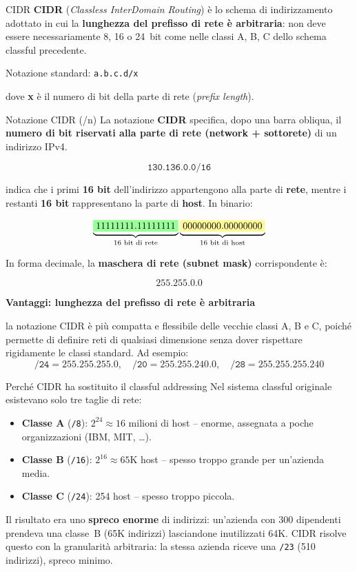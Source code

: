 \documentclass[a4paper,12pt]{report}
\begin{document}
\begin{defbox}{CIDR}
\textbf{CIDR} (\textit{Classless InterDomain Routing}) è lo schema di
indirizzamento adottato in cui la \textbf{lunghezza del prefisso
di rete è arbitraria}: non deve essere necessariamente 8, 16 o 24~bit
come nelle classi A, B, C dello schema classful precedente.

Notazione standard: \quad \texttt{a.b.c.d/x}

dove \textbf{x} è il numero di bit della parte di rete
(\textit{prefix length}).
\end{defbox}
\begin{notebox}{Notazione CIDR (/n)}
La notazione \textbf{CIDR} specifica, dopo una barra obliqua, il \textbf{numero di bit riservati alla parte di rete (network + sottorete)} di un indirizzo IPv4.

\[
\texttt{130.136.0.0/16}
\]

indica che i primi \textbf{16 bit} dell’indirizzo appartengono alla parte di \textbf{rete}, mentre i restanti \textbf{16 bit} rappresentano la parte di \textbf{host}.  
In binario:

\[
\underbrace{\colorbox{green!40}{11111111.11111111}}_{\text{16 bit di rete}}
\underbrace{\colorbox{yellow!40}{00000000.00000000}}_{\text{16 bit di host}}
\]

In forma decimale, la \textbf{maschera di rete (subnet mask)} corrispondente è:

\[
255.255.0.0
\]

\textbf{Vantaggi: \textbf{lunghezza del prefisso
di rete è arbitraria}}

la notazione CIDR è più compatta e flessibile delle vecchie classi A, B e C, poiché permette di definire reti di qualsiasi dimensione senza dover rispettare rigidamente le classi standard.  
Ad esempio:
\[
\texttt{/24} = 255.255.255.0, \quad \texttt{/20} = 255.255.240.0, \quad \texttt{/28} = 255.255.255.240
\]


\end{notebox}

\begin{notebox}{Perché CIDR ha sostituito il classful addressing}
Nel sistema classful originale esistevano solo tre taglie di rete:
\begin{itemize}
    \item \textbf{Classe A} (\texttt{/8}): $2^{24} \approx 16$ milioni
          di host -- enorme, assegnata a poche organizzazioni
          (IBM, MIT, \ldots).
    \item \textbf{Classe B} (\texttt{/16}): $2^{16} \approx 65$K host
          -- spesso troppo grande per un'azienda media.
    \item \textbf{Classe C} (\texttt{/24}): 254 host -- spesso troppo
          piccola.
\end{itemize}
Il risultato era uno \textbf{spreco enorme} di indirizzi: un'azienda con
300 dipendenti prendeva una classe~B (65K indirizzi) lasciandone
inutilizzati 64K. CIDR risolve questo con la granularità arbitraria:
la stessa azienda riceve una \texttt{/23} (510 indirizzi), spreco minimo.

\end{notebox}
\end{document}
